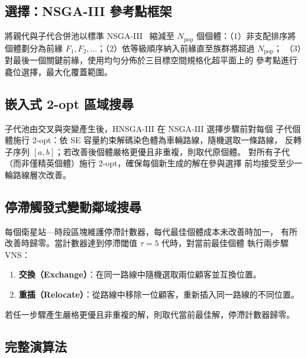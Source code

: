 \documentclass[11pt, a4paper]{article}
\numberwithin{equation}{section}
\begin{document}
\subsection{選擇：NSGA-III 參考點框架}

將親代與子代合併池以標準 NSGA-III~\cite{deb2014nsga3} 縮減至
$N_{\mathrm{pop}}$ 個個體：（1）非支配排序將個體劃分為前緣
$F_1,F_2,\ldots$；（2）依等級順序納入前緣直至族群將超過 $N_{\mathrm{pop}}$；
（3）對最後一個關鍵前緣，使用均勻分佈於三目標空間規格化超平面上的
參考點進行龕位選擇，最大化覆蓋範圍。

\subsection{嵌入式 2-opt 區域搜尋}

子代池由交叉與突變產生後，HNSGA-III 在 NSGA-III 選擇步驟前對每個
子代個體施行 2-opt：依 SE 容量約束解碼染色體為車輛路線，隨機選取一條路線，
反轉子序列 $[a,b]$；若改善後個體嚴格更優且非重複，則取代原個體。
對所有子代（而非僅精英個體）施行 2-opt，確保每個新生成的解在參與選擇
前均接受至少一輪路線層次改善。

\subsection{停滯觸發式變動鄰域搜尋}
\label{sec:vns}

每個衛星站—時段區塊維護停滯計數器，每代最佳個體成本未改善時加一，
有所改善時歸零。當計數器達到停滯閾值 $\tau=5$ 代時，對當前最佳個體
執行兩步驟 VNS：
\begin{enumerate}
  \item \textbf{交換（Exchange）}：在同一路線中隨機選取兩位顧客並互換位置。
  \item \textbf{重插（Relocate）}：從路線中移除一位顧客，重新插入同一路線的不同位置。
\end{enumerate}
若任一步驟產生嚴格更優且非重複的解，則取代當前最佳解，停滯計數器歸零。

\subsection{完整演算法}
\end{document}
